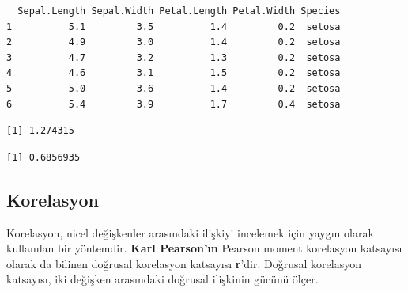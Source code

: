 \documentclass[
  letterpaper,
  DIV=11,
  numbers=noendperiod]{scrreprt}
\newenvironment{Shaded}{\begin{snugshade}}{\end{snugshade}}
\newcommand{\CommentTok}[1]{\textcolor[rgb]{0.37,0.37,0.37}{#1}}
\newcommand{\FunctionTok}[1]{\textcolor[rgb]{0.28,0.35,0.67}{#1}}
\newcommand{\NormalTok}[1]{\textcolor[rgb]{0.00,0.23,0.31}{#1}}
\newcommand{\SpecialCharTok}[1]{\textcolor[rgb]{0.37,0.37,0.37}{#1}}
\begin{document}
\begin{verbatim}
  Sepal.Length Sepal.Width Petal.Length Petal.Width Species
1          5.1         3.5          1.4         0.2  setosa
2          4.9         3.0          1.4         0.2  setosa
3          4.7         3.2          1.3         0.2  setosa
4          4.6         3.1          1.5         0.2  setosa
5          5.0         3.6          1.4         0.2  setosa
6          5.4         3.9          1.7         0.4  setosa
\end{verbatim}

\begin{Shaded}
\end{Shaded}

\begin{verbatim}
[1] 1.274315
\end{verbatim}

\begin{Shaded}
\end{Shaded}

\begin{verbatim}
[1] 0.6856935
\end{verbatim}

\hypertarget{korelasyon}{%
\subsection*{Korelasyon}\label{korelasyon}}

Korelasyon, nicel değişkenler arasındaki ilişkiyi incelemek için yaygın
olarak kullanılan bir yöntemdir. \textbf{Karl Pearson'ın} Pearson moment
korelasyon katsayısı olarak da bilinen doğrusal korelasyon katsayısı
\textbf{r}'dir. Doğrusal korelasyon katsayısı, iki değişken arasındaki
doğrusal ilişkinin gücünü ölçer.
\end{document}
